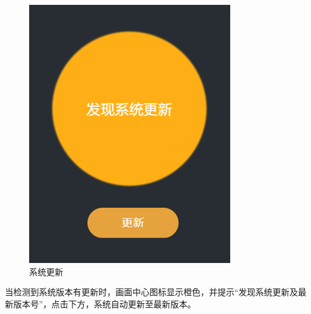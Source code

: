 \begin{figure}[htb]
{\begin{minipage}[t]{0.3\linewidth}
		\includegraphics[width=\linewidth]{screen/3-29.png}
	\end{minipage}}
	\caption{系统更新}
	\label{fig:系统更新}
\end{figure}

当检测到系统版本有更新时，画面中心图标显示橙色，并提示“发现系统更新及最新版本号”，点击下方，系统自动更新至最新版本。
